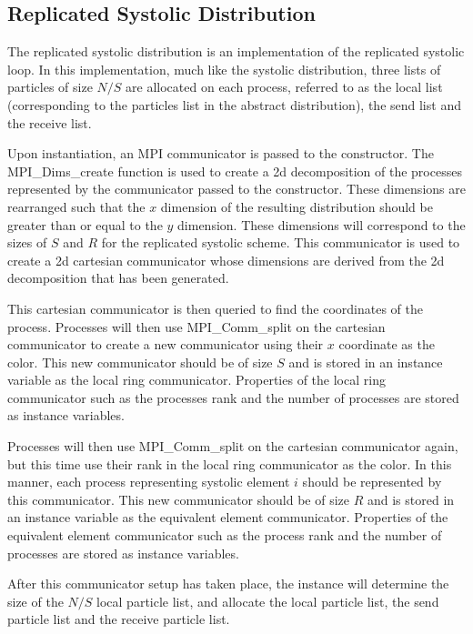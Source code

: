 \subsection{Replicated Systolic Distribution}

The replicated systolic distribution is an implementation of the
replicated systolic loop.
%
In this implementation, much like the systolic distribution,
three lists of particles of size $N/S$ are allocated on each process,
referred to as the local list (corresponding to the particles list
in the abstract distribution), the send list and the receive list.

Upon instantiation, an MPI communicator is passed to the constructor.
%
The MPI\_Dims\_create function is used to create a 2d decomposition
of the processes represented by the communicator passed to the
constructor.
%
These dimensions are rearranged such that the $x$ dimension of the
resulting distribution should be greater than or equal to the $y$
dimension.
%
These dimensions will correspond to the sizes of $S$ and $R$ for
the replicated systolic scheme.
%
This communicator is used to create a 2d cartesian communicator whose
dimensions are derived from the 2d decomposition that has been generated.

This cartesian communicator is then queried to find the coordinates of
the process.
%
Processes will then use MPI\_Comm\_split on the cartesian communicator
to create a new communicator using their $x$ coordinate as the color.
%
This new communicator should be of size $S$ and
is stored in an instance variable as the local ring communicator.
%
Properties of the local ring communicator such as the processes rank
and the number of processes are stored as instance variables.

Processes will then use MPI\_Comm\_split on the cartesian communicator
again, but this time use their rank in the local ring communicator as
the color.
%
In this manner, each process representing systolic element $i$ should
be represented by this communicator.
%
This new communicator should be of size $R$ and is stored in an instance
variable as the equivalent element communicator.
%
Properties of the equivalent element communicator such as the process rank
and the number of processes are stored as instance variables.

After this communicator setup has taken place, the instance will determine
the size of the $N/S$ local particle list, and allocate the local particle
list, the send particle list and the receive particle list.

